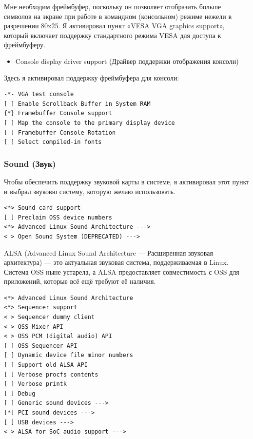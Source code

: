 \documentclass[10pt]{book}
\begin{document}
Мне необходим фреймбуфер, поскольку он позволяет отобразить больше символов на экране при работе в командном (консольном) режиме нежели в разрешении 80x25. Я активировал пункт «VESA VGA graphics support», который включает поддержку стандартного режима VESA для доступа к фреймбуферу. 

\begin{itemize}
\item Console display driver support (Драйвер поддержки отображения консоли)
\end{itemize}

Здесь я активировал поддержку фреймбуфера для консоли:

\vspace{3mm}
\begin{tcolorbox}[colback=gray!14!white, colframe=blue!75!blue]
\begin{lstlisting}
-*- VGA test console
[ ] Enable Scrollback Buffer in System RAM
{*} Framebuffer Console support
[ ] Map the console to the primary display device
[ ] Framebuffer Console Rotation
[ ] Select compiled-in fonts
\end{lstlisting}
\end{tcolorbox}

\subsubsection{Sound (Звук)}

Чтобы обеспечить поддержку звуковой карты в системе, я активировал этот пункт и выбрал звуковю систему, которую желаю использовать. 

\vspace{3mm}
\begin{tcolorbox}[colback=gray!14!white, colframe=blue!75!blue]
\begin{lstlisting}
<*> Sound card support
[ ] Preclaim OSS device numbers
<*> Advanced Linux Sound Architecture --->
< > Open Sound System (DEPRECATED) --->
\end{lstlisting}
\end{tcolorbox}

ALSA (Advanced Linux Sound Architecture — Расширенная звуковая архитектура) — это актуальная звуковая система, поддерживаемая в Linux. Система OSS ныне устарела, а ALSA предоставляет совместимость с OSS для приложений, которые всё ещё требуют её наличия. 

\vspace{3mm}
\begin{tcolorbox}[colback=gray!14!white, colframe=blue!75!blue]
\begin{lstlisting}
<*> Advanced Linux Sound Architecture
<*> Sequencer support
< > Sequencer dummy client
< > OSS Mixer API
< > OSS PCM (digital audio) API
[ ] OSS Sequencer API
[ ] Dynamic device file minor numbers
[ ] Support old ALSA API
[ ] Verbose procfs contents
[ ] Verbose printk
[ ] Debug
[ ] Generic sound devices --->
[*] PCI sound devices --->
[ ] USB devices --->
< > ALSA for SoC audio support --->
\end{lstlisting}
\end{tcolorbox}
\end{document}
